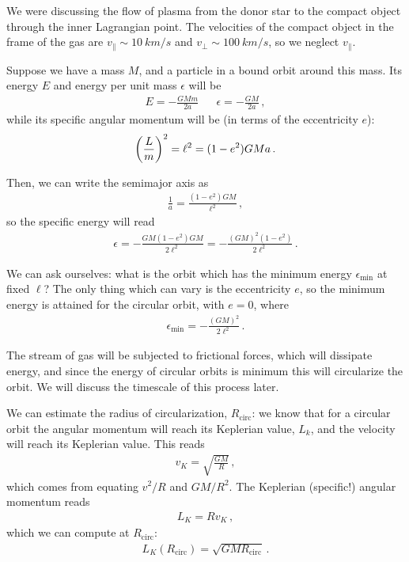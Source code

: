 \documentclass[main.tex]{subfiles}
\begin{document}

We were discussing the flow of plasma from the donor star to the compact object through the inner Lagrangian point.
The velocities of the compact object in the frame of the gas are \(v_\parallel \sim \SI{10}{km/s}\) and \(v_\perp \sim \SI{100}{km/s}\), so we neglect \(v_{\parallel}\).

Suppose we have a mass \(M\), and a particle in a bound orbit around this mass.
Its energy \(E\) and energy per unit mass \(\epsilon \) will be 
%
\begin{align}
E = - \frac{GMm}{2a} && \epsilon = - \frac{GM}{2a} 
\,,
\end{align}
%
while its specific angular momentum will be (in terms of the eccentricity \(e\)):
%
\begin{align}
\qty( \frac{L}{m})^2 = \ell^2 = (1 - e^2) GMa
\,.
\end{align}

Then, we can write the semimajor axis as 
%
\begin{align}
\frac{1}{a} = \frac{(1-e^2) GM}{\ell^2}
\,,
\end{align}
%
so the specific energy will read
\begin{align}
\epsilon = - \frac{GM (1-e^2) GM}{2\ell^2}= - \frac{(GM)^2(1-e^2)}{2 \ell^2}
\,.
\end{align}

We can ask ourselves: what is the orbit which has the minimum energy \(\epsilon _{\text{min}}\) at fixed \(\ell\)? The only thing which can vary is the eccentricity \(e\), so the minimum energy is attained for the circular orbit, with \(e = 0\), where 
%
\begin{align}
\epsilon _{\text{min}} = -\frac{(GM)^2}{2 \ell^2}
\,.
\end{align}

The stream of gas will be subjected to frictional forces, which will dissipate energy, and since the energy of circular orbits is minimum this will circularize the orbit. 
We will discuss the timescale of this process later.

We can estimate the radius of circularization, \(R _{\text{circ}}\): we know that for a circular orbit the angular momentum will reach its Keplerian value, \(L_k\), and the velocity will reach its Keplerian value. 
This reads 
%
\begin{align}
v_K = \sqrt{ \frac{GM}{R}} 
\,,
\end{align}
%
which comes from equating \(v^2 /R\) and \(GM/ R^2\).
The Keplerian (specific!) angular momentum reads 
%
\begin{align}
L_K = R v_K 
\,,
\end{align}
%
which we can compute at \(R _{\text{circ}}\): 
%
\begin{align}
L_K (R _{\text{circ}}) = \sqrt{GM R _{\text{circ}}}
\,.
\end{align}
\end{document}
